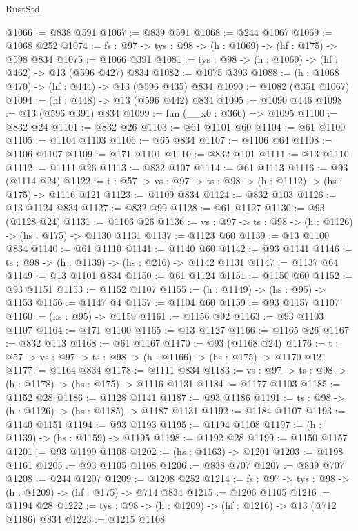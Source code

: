 \begin{lexlean}{RustStd}
\begin{coremodule}
@1066 := @838 @591
@1067 := @839 @591
@1068 := @244 @1067
@1069 := @1068 @252
@1074 := {fs : @97} -> {tys : @98} -> (h : @1069) -> (hf : @175) -> @598 @834
@1075 := @1066 @391
@1081 := {tys : @98} -> (h : @1069) -> (hf : @462) -> @13 (@596 @427) @834
@1082 := @1075 @393
@1088 := (h : @1068 @470) -> (hf : @444) -> @13 (@596 @435) @834
@1090 := @1082 (@351 @1067)
@1094 := (hf : @448) -> @13 (@596 @442) @834
@1095 := @1090 @446
@1098 := @13 (@596 @391) @834
@1099 := fun (__x0 : @366) => @1095
@1100 := @832 @24
@1101 := @832 @26
@1103 := @61 @1101 @60
@1104 := @61 @1100
@1105 := @1104 @1103
@1106 := @65 @834
@1107 := @1106 @64
@1108 := @1106 @1107
@1109 := @171 @1101
@1110 := @832 @101
@1111 := @13 @1110
@1112 := @1111 @26
@1113 := @832 @107
@1114 := @61 @1113
@1116 := @93 (@1114 @24)
@1122 := {t : @57} -> {vs : @97} -> {ts : @98} -> (h : @1112) -> (hs : @175) -> @1116 @121
@1123 := @1109 @834
@1124 := @832 @103
@1126 := @13 @1124 @834
@1127 := @832 @99
@1128 := @61 @1127
@1130 := @93 (@1128 @24)
@1131 := @1106 @26
@1136 := {vs : @97} -> {ts : @98} -> (h : @1126) -> (hs : @175) -> @1130 @1131
@1137 := @1123 @60
@1139 := @13 @1100 @834
@1140 := @61 @1110
@1141 := @1140 @60
@1142 := @93 @1141
@1146 := {ts : @98} -> (h : @1139) -> (hs : @216) -> @1142 @1131
@1147 := @1137 @64
@1149 := @13 @1101 @834
@1150 := @61 @1124
@1151 := @1150 @60
@1152 := @93 @1151
@1153 := @1152 @1107
@1155 := (h : @1149) -> (hs : @95) -> @1153
@1156 := @1147 @4
@1157 := @1104 @60
@1159 := @93 @1157 @1107
@1160 := (hs : @95) -> @1159
@1161 := @1156 @92
@1163 := @93 @1103 @1107
@1164 := @171 @1100
@1165 := @13 @1127
@1166 := @1165 @26
@1167 := @832 @113
@1168 := @61 @1167
@1170 := @93 (@1168 @24)
@1176 := {t : @57} -> {vs : @97} -> {ts : @98} -> (h : @1166) -> (hs : @175) -> @1170 @121
@1177 := @1164 @834
@1178 := @1111 @834
@1183 := {vs : @97} -> {ts : @98} -> (h : @1178) -> (hs : @175) -> @1116 @1131
@1184 := @1177 @1103
@1185 := @1152 @28
@1186 := @1128 @1141
@1187 := @93 @1186
@1191 := {ts : @98} -> (h : @1126) -> (hs : @1185) -> @1187 @1131
@1192 := @1184 @1107
@1193 := @1140 @1151
@1194 := @93 @1193
@1195 := @1194 @1108
@1197 := (h : @1139) -> (hs : @1159) -> @1195
@1198 := @1192 @28
@1199 := @1150 @1157
@1201 := @93 @1199 @1108
@1202 := (hs : @1163) -> @1201
@1203 := @1198 @1161
@1205 := @93 @1105 @1108
@1206 := @838 @707
@1207 := @839 @707
@1208 := @244 @1207
@1209 := @1208 @252
@1214 := {fs : @97} -> {tys : @98} -> (h : @1209) -> (hf : @175) -> @714 @834
@1215 := @1206 @1105
@1216 := @1194 @28
@1222 := {tys : @98} -> (h : @1209) -> (hf : @1216) -> @13 (@712 @1186) @834
@1223 := @1215 @1108

\end{coremodule}
\end{lexlean}
